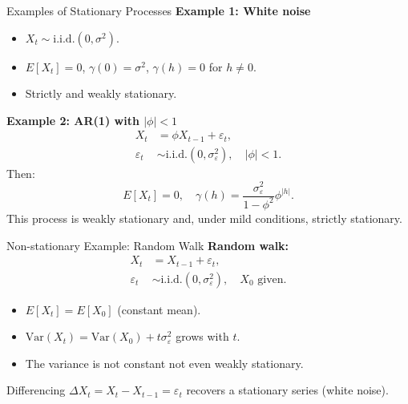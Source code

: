 \documentclass{beamer}
\begin{document}
\begin{frame}{Examples of Stationary Processes}
  \textbf{Example 1: White noise}
  \begin{itemize}
    \item $X_t \sim \text{i.i.d.}(0, \sigma^2)$.
    \item $E[X_t] = 0$, $\gamma(0) = \sigma^2$, $\gamma(h) = 0$ for $h \neq 0$.
    \item Strictly and weakly stationary.
  \end{itemize}

  \vspace{0.3cm}
  \textbf{Example 2: AR(1) with $| \phi | < 1$}
  \begin{align*}
    X_t &= \phi X_{t-1} + \varepsilon_t, \\
    \varepsilon_t &\sim \text{i.i.d.}(0, \sigma_\varepsilon^2), \quad |\phi|<1.
  \end{align*}
  Then:
  \[
    E[X_t] = 0, \quad
    \gamma(h) = \frac{\sigma_\varepsilon^2}{1 - \phi^2} \phi^{|h|}.
  \]
  This process is weakly stationary and, under mild conditions, strictly stationary.
\end{frame}

\begin{frame}{Non-stationary Example: Random Walk}
  \textbf{Random walk:}
  \begin{align*}
    X_t &= X_{t-1} + \varepsilon_t, \\
    \varepsilon_t &\sim \text{i.i.d.}(0, \sigma_\varepsilon^2),
    \quad X_0 \text{ given}.
  \end{align*}

  \vspace{0.2cm}
  \begin{itemize}
    \item $E[X_t] = E[X_0]$ (constant mean).
    \item $\mathrm{Var}(X_t) = \mathrm{Var}(X_0) + t \sigma_\varepsilon^2$ grows with $t$.
    \item The variance is not constant \textrightarrow{} not even weakly stationary.
  \end{itemize}

  \vspace{0.2cm}
  Differencing $\Delta X_t = X_t - X_{t-1} = \varepsilon_t$ recovers a stationary series (white noise).
\end{frame}
\end{document}
